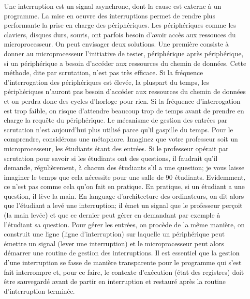 Une interruption est un signal asynchrone, dont la cause est externe à un programme. La mise en oeuvre des interruptions permet de rendre plus performante la prise en charge des périphériques. Les périphériques comme les claviers, disques durs, souris, ont parfois besoin d'avoir accès aux ressouces du microprocesseur. On peut envisager deux solutions. Une première consiste à donner au microprocesseur l'initiative de tester, périphérique après périphérique, si un périphérique a besoin d'accéder aux ressources du chemin de données. Cette méthode, dite par scrutation, n'est pas très efficace. Si la fréquence d'interrogation des périphériques est élevée, la pluspart du temps, les périphériques n'auront pas besoin d'accéder aux ressources du chemin de données et on perdra donc des cycles d'horloge pour rien. Si la fréquence d'interrogation est trop faible, on risque d'attendre beaucoup trop de temps avant de prendre en charge la requête du périphérique. Le mécanisme de gestion des entrées par scrutation n'est aujourd'hui plus utilisé parce qu'il gaspille du temps. Pour le comprendre, considérons une métaphore. Imaginez que votre professeur soit un microprocesseur, les étudiants étant des entrées. Si le professeur opérait par scrutation pour savoir si les étudiants ont des questions, il faudrait qu'il demande, régulièrement, à chacun des étudiants s'il a une question; je vous laisse imaginer le temps que cela nécessite pour une salle de 90 étudiants. Evidemment, ce n'est pas comme cela qu'on fait en pratique. En pratique, si un étudiant a une question, il lève la main. En language d'architecture des ordinateurs, on dit alors que l'étudiant a levé une interruption; il émet un signal que le professeur perçoit (la main levée) et que ce dernier peut gérer en demandant par exemple à l'étudiant sa question. Pour gérer les entrées, on procède de la même manière, on construit une ligne (ligne d'interruption) sur laquelle un périphérique peut émettre un signal (lever une interruption) et le microprocesseur peut alors démarrer une routine de gestion des interruptions. Il est essentiel que la gestion d'une interruption se fasse de manière transparente pour le programme qui s'est fait interrompre et, pour ce faire, le contexte d'exécution (état des registres) doit être sauvegardé avant de partir en interruption et restauré après la routine d'interruption terminée.

